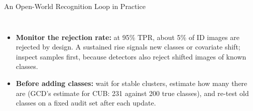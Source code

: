 \begin{frame}{An Open-World Recognition Loop in Practice}
\begin{columns}[T,onlytextwidth]
\begin{itemize}
        \item \textbf{Monitor the rejection rate:} at 95\% TPR, about 5\% of ID images are rejected by design. A sustained rise signals new classes or covariate shift; inspect samples first, because detectors also reject shifted images of known classes.
        \item \textbf{Before adding classes:} wait for stable clusters, estimate how many there are (GCD's estimate for CUB: 231 against 200 true classes), and re-test old classes on a fixed audit set after each update.
      \end{itemize}
  \end{columns}
\end{frame}
